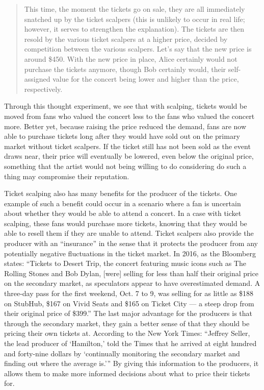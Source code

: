 \begin{quote}
This time, the moment the tickets go on sale, they are all immediately snatched up by the ticket scalpers (this is unlikely to occur in real life; however, it serves to strengthen the explanation). The tickets are then resold by the various ticket scalpers at a higher price, decided by competition between the various scalpers. Let’s say that the new price is around \$450. With the new price in place, Alice certainly would not purchase the tickets anymore, though Bob certainly would, their self-assigned value for the concert being lower and higher than the price, respectively.  
\end{quote}

Through this thought experiment, we see that with scalping, tickets would be moved from fans who valued the concert less to the fans who valued the concert more. Better yet, because raising the price reduced the demand, fans are now able to purchase tickets long after they would have sold out on the primary market without ticket scalpers. If the ticket still has not been sold as the event draws near, their price will eventually be lowered, even below the original price, something that the artist would not being willing to do considering do such a thing may compromise their reputation. 

Ticket scalping also has many benefits for the producer of the tickets. One example of such a benefit could occur in a scenario where a fan is uncertain about whether they would be able to attend a concert. In a case with ticket scalping, these fans would purchase more tickets, knowing that they would be able to resell them if they are unable to attend. Ticket scalpers also provide the producer with an “insurance” in the sense that it protects the producer from any potentially negative fluctuations in the ticket market. In 2016, as the Bloomberg states: “Tickets to Desert Trip, the concert featuring music icons such as The Rolling Stones and Bob Dylan, [were] selling for less than half their original price on the secondary market, as speculators appear to have overestimated demand. A three-day pass for the first weekend, Oct. 7 to 9, was selling for as little as \$188 on StubHub, \$167 on Vivid Seats and \$165 on Ticket City — a steep drop from their original price of \$399.” The last major advantage for the producers is that through the secondary market, they gain a better sense of that they should be pricing their own tickets at. According to the New York Times: “Jeffrey Seller, the lead producer of ‘Hamilton,’ told the Times that he arrived at eight hundred and forty-nine dollars by ‘continually monitoring the secondary market and finding out where the average is.’” By giving this information to the producers, it allows them to make more informed decisions about what to price their tickets for. 

